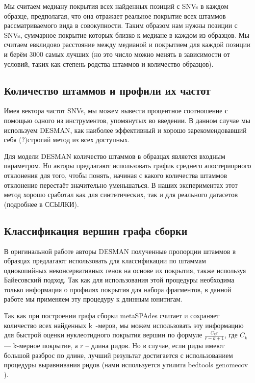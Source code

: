 \documentclass{spbau-diploma}
\begin{document}
Мы считаем медиану покрытия всех найденных позиций с SNVs в каждом образце, предполагая, что она отражает реальное покрытие всех штаммов рассматриваемого вида в совокупности. Таким образом нам нужны позиции с SNVs, суммарное покрытие которых близко к медиане в каждом из образцов. Мы считаем евклидово расстояние между медианой и покрытием для каждой позиции и берём 3000 самых лучших (но это число можно менять в зависимости от условий, таких как степень родства штаммов и количество образцов).

\subsection{Количество штаммов и профили их частот}

Имея вектора частот SNVs, мы можем вывести процентное соотношение с помощью одного из инструментов, упомянутых во введении. В данном случае мы используем DESMAN, как наиболее эффективный и хорошо зарекомендовавший себя (?)строгий метод из всех доступных. 

Для модели DESMAN количество штаммов в образцах является входным параметром. Но авторы предлагают использовать график среднего апостериорного отклонения для того, чтобы понять, начиная с какого количества штаммов отклонение перестаёт значительно уменьшаться. В наших экспериментах этот метод хорошо сработал как для синтетических, так и для реального датасетов (подробнее в ССЫЛКИ).

\subsection{Классификация вершин графа сборки}

В оригинальной работе авторы DESMAN полученные пропорции штаммов в образцах предлагают использовать для классификации по штаммам однокопийных неконсервативных генов на основе их покрытия, также используя Байесовский подход. Так как для использования этой процедуры необходима только информация о профилях покрытия для набора фрагментов, в данной работе мы применяем эту процедуру к длинным юнитигам. 

Так как при построении графа сборки metaSPAdes считает и сохраняет количество всех найденных k~-меров, мы можем использовать эту информацию для быстрой оценки нуклеотидного покрытия вершин по формуле $\frac{C_k r}{r - k + 1}$, где $C_k$ --- k-мерное покрытие, а $r$ -- длина ридов. Но в случае, если риды имеют большой разброс по длине, лучший результат достигается с использованием процедуры выравнивания ридов (нами используется утилита bedtools genomecov \cite{bedtools}).
\end{document}
